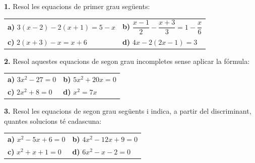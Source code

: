 \documentclass[13pt,a4paper]{extarticle}
\begin{document}
\par\noindent\begin{minipage}{\linewidth}
\textbf{1.} Resol les equacions de primer grau següents:\par


\begin{tabular}{@{}p{.46\linewidth}p{.46\linewidth}@{}}
\textbf{a)} $3(x-2)-2(x+1)=5-x$ & \textbf{b)} $\dfrac{x-1}{2}-\dfrac{x+3}{3}=1-\dfrac{x}{6}$ \\[9pt]
\textbf{c)} $2(x+3)-x=x+6$ & \textbf{d)} $4x-2(2x-1)=3$ \\[3pt]
\end{tabular}\par
\end{minipage}\par\vspace{1.6mm}
\par\noindent\begin{minipage}{\linewidth}
\textbf{2.} Resol aquestes equacions de segon grau incompletes sense aplicar la fórmula:\par


\begin{tabular}{@{}p{.46\linewidth}p{.46\linewidth}@{}}
\textbf{a)} $3x^2-27=0$ & \textbf{b)} $5x^2+20x=0$ \\[3pt]
\textbf{c)} $2x^2+8=0$ & \textbf{d)} $x^2=7x$ \\[3pt]
\end{tabular}\par
\end{minipage}\par\vspace{1.6mm}
\par\noindent\begin{minipage}{\linewidth}
\textbf{3.} Resol les equacions de segon grau següents i indica, a partir del discriminant, quantes solucions té cadascuna:\par


\begin{tabular}{@{}p{.46\linewidth}p{.46\linewidth}@{}}
\textbf{a)} $x^2-5x+6=0$ & \textbf{b)} $4x^2-12x+9=0$ \\[3pt]
\textbf{c)} $x^2+x+1=0$ & \textbf{d)} $6x^2-x-2=0$ \\[3pt]
\end{tabular}\par
\end{minipage}\par\vspace{1.6mm}
\end{document}
